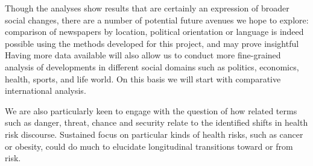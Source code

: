 Though the analyses show results that are certainly an expression of broader social changes, there are a number of potential future avenues we hope to explore: comparison of newspapers by location, political orientation or language is indeed possible using the methods developed for this project, and may prove insightful Having more data available will also allow us to conduct more fine-grained analysis of developments in different social domains such as politics, economics, health, sports, and life world. On this basis we will start with comparative international analysis.

We are also particularly keen to engage with the question of how related terms such as danger, threat, chance and security relate to the identified shifts in health risk discourse. Sustained focus on particular kinds of health risks, such as cancer or obesity, could do much to elucidate longitudinal transitions toward or from risk. 















